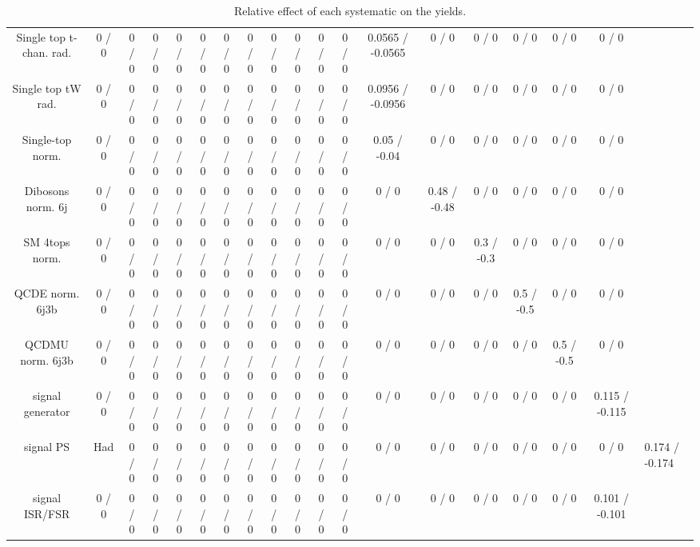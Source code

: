 \documentclass[10pt]{article}
\begin{document}
\begin{table}[htbp]
\begin{center}
\begin{tabular}{|c|c|c|c|c|c|c|c|c|c|c|c|c|c|c|c|c|c|}
  Single top t-chan. rad. & 0 / 0 & 0 / 0 & 0 / 0 & 0 / 0 & 0 / 0 & 0 / 0 & 0 / 0 & 0 / 0 & 0 / 0 & 0 / 0 & 0 / 0 & 0.0565 / -0.0565 & 0 / 0 & 0 / 0 & 0 / 0 & 0 / 0 & 0 / 0 \\ 
  Single top tW rad. & 0 / 0 & 0 / 0 & 0 / 0 & 0 / 0 & 0 / 0 & 0 / 0 & 0 / 0 & 0 / 0 & 0 / 0 & 0 / 0 & 0 / 0 & 0.0956 / -0.0956 & 0 / 0 & 0 / 0 & 0 / 0 & 0 / 0 & 0 / 0 \\ 
  Single-top norm. & 0 / 0 & 0 / 0 & 0 / 0 & 0 / 0 & 0 / 0 & 0 / 0 & 0 / 0 & 0 / 0 & 0 / 0 & 0 / 0 & 0 / 0 & 0.05 / -0.04 & 0 / 0 & 0 / 0 & 0 / 0 & 0 / 0 & 0 / 0 \\ 
  Dibosons norm. 6j & 0 / 0 & 0 / 0 & 0 / 0 & 0 / 0 & 0 / 0 & 0 / 0 & 0 / 0 & 0 / 0 & 0 / 0 & 0 / 0 & 0 / 0 & 0 / 0 & 0.48 / -0.48 & 0 / 0 & 0 / 0 & 0 / 0 & 0 / 0 \\ 
  SM 4tops norm. & 0 / 0 & 0 / 0 & 0 / 0 & 0 / 0 & 0 / 0 & 0 / 0 & 0 / 0 & 0 / 0 & 0 / 0 & 0 / 0 & 0 / 0 & 0 / 0 & 0 / 0 & 0.3 / -0.3 & 0 / 0 & 0 / 0 & 0 / 0 \\ 
  QCDE norm. 6j3b & 0 / 0 & 0 / 0 & 0 / 0 & 0 / 0 & 0 / 0 & 0 / 0 & 0 / 0 & 0 / 0 & 0 / 0 & 0 / 0 & 0 / 0 & 0 / 0 & 0 / 0 & 0 / 0 & 0.5 / -0.5 & 0 / 0 & 0 / 0 \\ 
  QCDMU norm. 6j3b & 0 / 0 & 0 / 0 & 0 / 0 & 0 / 0 & 0 / 0 & 0 / 0 & 0 / 0 & 0 / 0 & 0 / 0 & 0 / 0 & 0 / 0 & 0 / 0 & 0 / 0 & 0 / 0 & 0 / 0 & 0.5 / -0.5 & 0 / 0 \\ 
  signal generator & 0 / 0 & 0 / 0 & 0 / 0 & 0 / 0 & 0 / 0 & 0 / 0 & 0 / 0 & 0 / 0 & 0 / 0 & 0 / 0 & 0 / 0 & 0 / 0 & 0 / 0 & 0 / 0 & 0 / 0 & 0 / 0 & 0.115 / -0.115 \\ 
  signal PS & Had & 0 / 0 & 0 / 0 & 0 / 0 & 0 / 0 & 0 / 0 & 0 / 0 & 0 / 0 & 0 / 0 & 0 / 0 & 0 / 0 & 0 / 0 & 0 / 0 & 0 / 0 & 0 / 0 & 0 / 0 & 0 / 0 & 0.174 / -0.174 \\ 
  signal ISR/FSR & 0 / 0 & 0 / 0 & 0 / 0 & 0 / 0 & 0 / 0 & 0 / 0 & 0 / 0 & 0 / 0 & 0 / 0 & 0 / 0 & 0 / 0 & 0 / 0 & 0 / 0 & 0 / 0 & 0 / 0 & 0 / 0 & 0.101 / -0.101 \\ 
\hline 
\end{tabular} 
\caption{Relative effect of each systematic on the yields.} 
\end{center} 
\end{table} 
\end{document}
